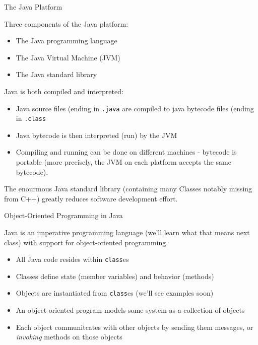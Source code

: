 \documentclass{beamer}
\begin{document}
\begin{frame}[fragile]{The Java Platform}


Three components of the Java platform:
\begin{itemize}
\item The Java programming language
\item The Java Virtual Machine (JVM)
\item The Java standard library
\end{itemize}
Java is both compiled and interpreted:
\begin{itemize}
\item Java source files (ending in {\tt .java} are compiled to java
  bytecode files (ending in {\tt .class}
\item Java bytecode is then interpreted (run) by the JVM
\item Compiling and running can be done on different machines -
  bytecode is portable (more precisely, the JVM on each platform
  accepts the same bytecode).
\end{itemize}
The enourmous Java standard library (containing many Classes notably
missing from C++) greatly reduces software development effort.
\end{frame}


\begin{frame}[fragile]{Object-Oriented Programming in Java}


Java is an imperative programming language (we'll learn what that means next class) with support for object-oriented programming.

\begin{itemize}
\item All Java code resides within {\tt class}es
\item Classes define state (member variables) and behavior (methods)
\item Objects are instantiated from {\tt class}es (we'll see examples soon)
\item An object-oriented program models some system as a collection of objects
\item Each object communitcates with other objects by sending them messages, or {\it invoking} methods on those objects
\end{itemize}

\end{frame}
\end{document}
